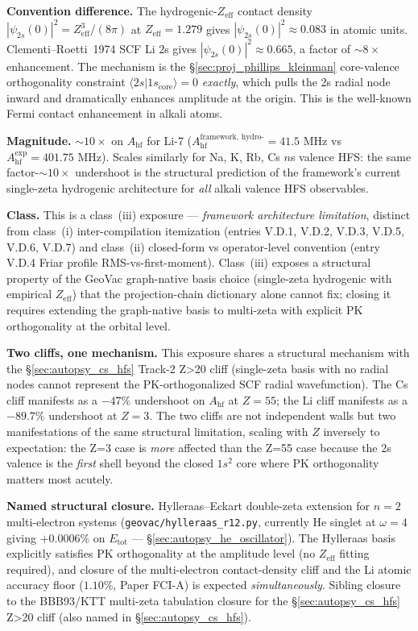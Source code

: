 \documentclass[11pt]{article}
\begin{document}
\textbf{Convention difference.}  The hydrogenic-$Z_\text{eff}$ contact
density $|\psi_{2s}(0)|^2 = Z_\text{eff}^3/(8\pi)$ at
$Z_\text{eff} = 1.279$ gives $|\psi_{2s}(0)|^2 \approx 0.083$
in atomic units.  Clementi--Roetti~1974 SCF Li 2s gives
$|\psi_{2s}(0)|^2 \approx 0.665$, a factor of $\sim 8\times$
enhancement.  The mechanism is the
\S\ref{sec:proj_phillips_kleinman} core-valence orthogonality
constraint $\langle 2s | 1s_\text{core}\rangle = 0$ \emph{exactly},
which pulls the 2s radial node inward and dramatically enhances
amplitude at the origin.  This is the well-known Fermi contact
enhancement in alkali atoms.

\textbf{Magnitude.}  $\sim 10\times$ on $A_\text{hf}$ for Li-7
($A_\text{hf}^\text{framework, hydro-} = 41.5$ MHz vs
$A_\text{hf}^\text{exp} = 401.75$ MHz).  Scales similarly for
Na, K, Rb, Cs $n$s valence HFS:
the same factor-$\sim 10\times$ undershoot is the structural prediction
of the framework's current single-zeta hydrogenic architecture for
\emph{all} alkali valence HFS observables.

\textbf{Class.}  This is a class~(iii) exposure --- \emph{framework
architecture limitation}, distinct from class~(i) inter-compilation
itemization (entries V.D.1, V.D.2, V.D.3, V.D.5, V.D.6, V.D.7)
and class~(ii) closed-form vs operator-level convention (entry V.D.4
Friar profile RMS-vs-first-moment).  Class~(iii) exposes a structural
property of the GeoVac graph-native basis choice (single-zeta
hydrogenic with empirical $Z_\text{eff}$) that the projection-chain
dictionary alone cannot fix; closing it requires extending the
graph-native basis to multi-zeta with explicit PK orthogonality at
the orbital level.

\textbf{Two cliffs, one mechanism.}  This exposure shares a structural
mechanism with the \S\ref{sec:autopsy_cs_hfs} Track-2 Z\textgreater 20
cliff (single-zeta basis with no radial nodes cannot represent the
PK-orthogonalized SCF radial wavefunction).  The Cs cliff manifests
as a $-47\%$ undershoot on $A_\text{hf}$ at $Z=55$; the Li cliff
manifests as a $-89.7\%$ undershoot at $Z=3$.  The two cliffs are
not independent walls but two manifestations of the same structural
limitation, scaling with $Z$ inversely to expectation: the Z=3 case
is \emph{more} affected than the Z=55 case because the 2s valence is
the \emph{first} shell beyond the closed $1s^2$ core where PK
orthogonality matters most acutely.

\textbf{Named structural closure.}  Hylleraas--Eckart double-zeta
extension for $n=2$ multi-electron systems
(\texttt{geovac/hylleraas\_r12.py}, currently He singlet at $\omega=4$
giving $+0.0006\%$ on $E_\text{tot}$ --- \S\ref{sec:autopsy_he_oscillator}).
The Hylleraas basis explicitly satisfies PK orthogonality at the
amplitude level (no $Z_\text{eff}$ fitting required), and closure of
the multi-electron contact-density cliff and the Li atomic accuracy
floor ($1.10\%$, Paper FCI-A) is expected \emph{simultaneously}.
Sibling closure to the BBB93/KTT multi-zeta tabulation closure for
the \S\ref{sec:autopsy_cs_hfs} Z\textgreater 20 cliff (also named in
\S\ref{sec:autopsy_cs_hfs}).
\end{document}
